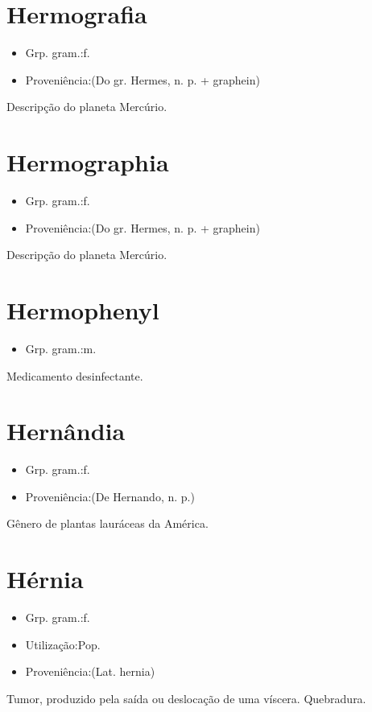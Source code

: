 \documentclass{article}
\begin{document}
\section{Hermografia}
\begin{itemize}
\item {Grp. gram.:f.}
\end{itemize}
\begin{itemize}
\item {Proveniência:(Do gr. \textunderscore Hermes\textunderscore , n. p. + \textunderscore graphein\textunderscore )}
\end{itemize}
Descripção do planeta Mercúrio.
\section{Hermographia}
\begin{itemize}
\item {Grp. gram.:f.}
\end{itemize}
\begin{itemize}
\item {Proveniência:(Do gr. \textunderscore Hermes\textunderscore , n. p. + \textunderscore graphein\textunderscore )}
\end{itemize}
Descripção do planeta Mercúrio.
\section{Hermophenyl}
\begin{itemize}
\item {Grp. gram.:m.}
\end{itemize}
Medicamento desinfectante.
\section{Hernândia}
\begin{itemize}
\item {Grp. gram.:f.}
\end{itemize}
\begin{itemize}
\item {Proveniência:(De \textunderscore Hernando\textunderscore , n. p.)}
\end{itemize}
Gênero de plantas lauráceas da América.
\section{Hérnia}
\begin{itemize}
\item {Grp. gram.:f.}
\end{itemize}
\begin{itemize}
\item {Utilização:Pop.}
\end{itemize}
\begin{itemize}
\item {Proveniência:(Lat. \textunderscore hernia\textunderscore )}
\end{itemize}
Tumor, produzido pela saída ou deslocação de uma víscera.
Quebradura.
\end{document}
